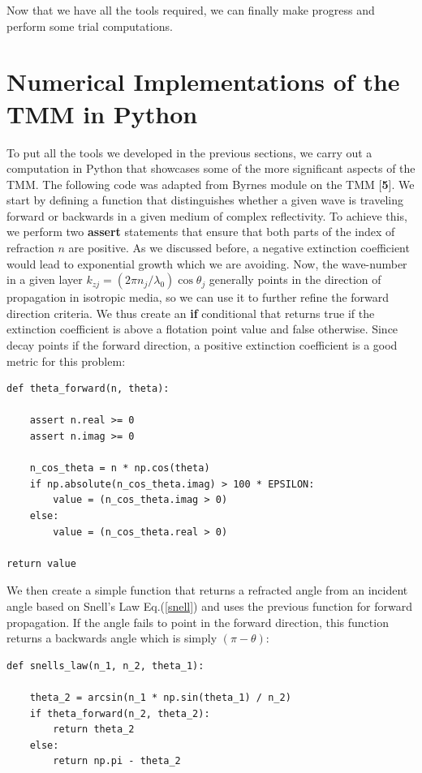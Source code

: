 \documentclass[preprint, onecolumn, amsmath, amssymb, aps]{revtex4-1}
\numberwithin{equation}{section}
\begin{document}
Now that we have all the tools required, we can finally make progress and perform some trial computations.

\section{Numerical Implementations of the TMM in Python} 

To put all the tools we developed in the previous sections, we carry out a computation in Python that showcases some of the more significant aspects of the TMM. The following code was adapted from Byrnes module on the TMM [\textbf{5}]. We start by defining a function that distinguishes whether a given wave is traveling forward or backwards in a given medium of complex reflectivity. To achieve this, we perform two \textbf{assert} statements that ensure that both parts of the index of refraction $n$ are positive. As we discussed before, a negative extinction coefficient would lead to exponential growth which we are avoiding. Now, the wave-number in a given layer $k_{z j} = (2 \pi n_{j} / \lambda_{0}) \cos \theta_{j}$ generally points in the direction of propagation in isotropic media, so we can use it to further refine the forward direction criteria. We thus create an \textbf{if} conditional that returns true if the extinction coefficient is above a flotation point value and false otherwise. Since decay points if the forward direction, a positive extinction coefficient is a good metric for this problem:
\lstset{showspaces=false,showstringspaces=false}%
\begin{lstlisting}
def theta_forward(n, theta):

	assert n.real >= 0
	assert n.imag >= 0

	n_cos_theta = n * np.cos(theta)    
	if np.absolute(n_cos_theta.imag) > 100 * EPSILON:
		value = (n_cos_theta.imag > 0)
	else:
		value = (n_cos_theta.real > 0)

return value
\end{lstlisting}
\noindent
We then create a simple function that returns a refracted angle from an incident angle based on Snell's Law Eq.(\ref{snell}) and uses the previous function for forward propagation. If the angle fails to point in the forward direction, this function returns a backwards angle which is simply $(\pi - \theta)$:
\lstset{showspaces=false,showstringspaces=false}%
\begin{lstlisting}
def snells_law(n_1, n_2, theta_1):

	theta_2 = arcsin(n_1 * np.sin(theta_1) / n_2)
	if theta_forward(n_2, theta_2):
		return theta_2
	else:
		return np.pi - theta_2
\end{lstlisting}
\end{document}
